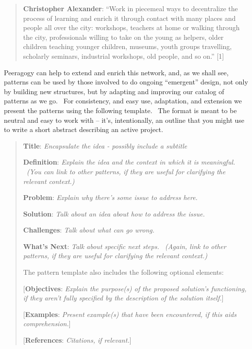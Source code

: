 \begin{quote}
\textbf{Christopher Alexander}: ``Work in piecemeal ways to decentralize
the process of learning and enrich it through contact with many places
and people all over the city: workshops, teachers at home or walking
through the city, professionals willing to take on the young as helpers,
older children teaching younger children, museums, youth groups
travelling, scholarly seminars, industrial workshops, old people, and so
on.'' {[}1{]}
\end{quote}

Peeragogy can help to extend and enrich this network, and, as we shall
see, patterns can be used by those involved to do ongoing ``emergent''
design, not only by building new structures, but by adapting and
improving our catalog of patterns as we go.~ For consistency, and easy
use, adaptation, and extension we present the patterns using the
following template.~ The format is meant to be neutral and easy to work
with -- it's, intentionally, an outline that you might use to write a
short abstract describing an active project.

\begin{quote}
\textbf{Title}: \emph{Encapsulate the idea - possibly include a
subtitle}

\textbf{Definition}: \emph{Explain the idea and the context in which it
is meaningful. ~(You can link to other patterns, if they are useful for
clarifying the relevant context.)}

\textbf{Problem}: \emph{Explain why there's some issue to address here.}

\textbf{Solution}: \emph{Talk about an idea about how to address the
issue.}

\textbf{Challenges}: \emph{Talk about what can go wrong.}

\textbf{What's Next}: \emph{Talk about specific next steps. ~(Again,
link to other patterns, if they are useful for clarifying the relevant
context.)}

The pattern template also includes the following optional elements:

{[}\textbf{Objectives}: \emph{Explain the purpose(s) of the proposed
solution's functioning, if they aren't fully specified by the
description of the solution itself.}{]}

{[}\textbf{Examples}: \emph{Present example(s) that have been
encountered, if this aids comprehension.}{]}

{[}\textbf{References}: \emph{Citations, if relevant.}{]}
\end{quote}


